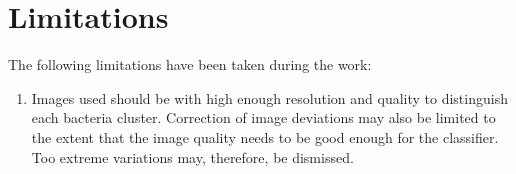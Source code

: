 \section{Limitations}
The following limitations have been taken during the work: 
\begin{enumerate}
    \item Images used should be with high enough resolution and quality to distinguish each bacteria cluster. Correction of image deviations may also be limited to the extent that the image quality needs to be good enough for the classifier. Too extreme variations may, therefore, be dismissed. 

\end{enumerate}





